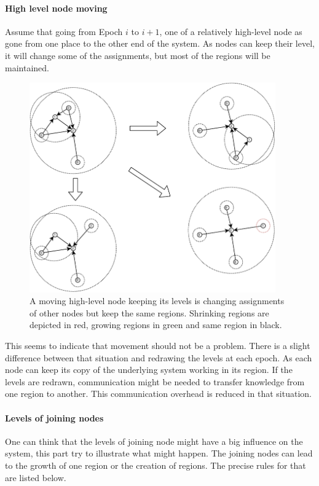 \documentclass[a4paper,11pt,oneside]{report}
\begin{document}
\paragraph{High level node moving}
Assume that going from Epoch $i$ to $i+1$, one of a relatively high-level node
as gone from one place to the other end of the system. As nodes can keep their
level, it will change some of the assignments, but most of the regions will be
maintained. 

\begin{figure}[!h] 
\centering
\includegraphics[width=300pt]{figures/LocarnoTreaties-Moving}
\caption{A moving high-level node keeping its levels is changing assignments of other
    nodes but keep the same regions. Shrinking regions are depicted in red,
    growing regions in green and same region in black. }
\label{fig:LocarnoTreaties-Moving}
\end{figure}

This seems to indicate that movement should not be a problem. There is a
slight difference between that situation and redrawing the levels at each
epoch. As each node can keep its copy of the underlying system working in its
region. If the levels are redrawn, communication might be needed to transfer
knowledge from one region to another. This communication overhead is reduced in
that situation. 

\paragraph{Levels of joining nodes}
One can think that the levels of joining node might have a big influence on the
system, this part try to illustrate what might happen.  The joining nodes can
lead to the growth of one region or the creation
of regions. The precise rules for that are listed below. 
\end{document}
